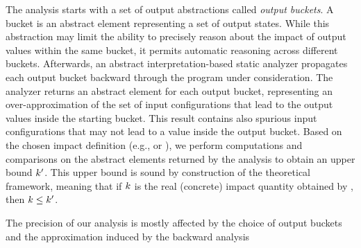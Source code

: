 The analysis starts with a set of output abstractions called \textit{output buckets}.
A bucket is an abstract element representing a set of output states.
While this abstraction may limit the ability to precisely reason about the impact of output values within the same bucket, it permits automatic reasoning across different buckets.
Afterwards, an abstract interpretation-based static analyzer propagates each output bucket backward through the program under consideration.
The analyzer returns an abstract element for each output bucket, representing an over-approximation of the set of input configurations that lead to the output values inside the starting bucket.
This result contains also spurious input configurations that may not lead to a value inside the output bucket.
Based on the chosen impact definition \impactwrappername{} (e.g., \rangename{} or \outcomesname), we perform computations and comparisons on the abstract elements returned by the analysis to obtain an upper bound $k'$. This upper bound is sound by construction of the theoretical framework, meaning that if $k$ is the real (concrete) impact quantity obtained by \impactwrappername, then $k\le k'$.

The precision of our analysis is mostly affected by the choice of output buckets and the approximation induced by the backward analysis 





